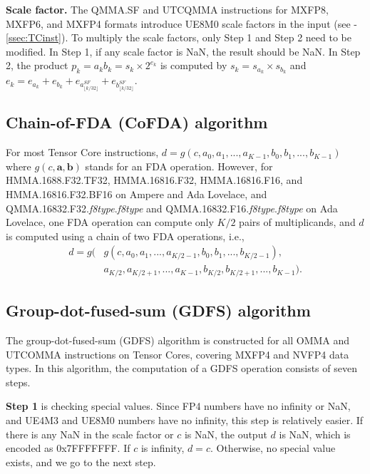 \textbf{Scale factor.} The QMMA.SF and UTCQMMA instructions for MXFP8, MXFP6, and MXFP4 formats introduce UE8M0 scale factors in the input (see -\ref{ssec:TCinst}). To multiply the scale factors, only Step 1 and Step 2 need to be modified. In Step 1, if any scale factor is NaN, the result should be NaN. In Step 2, the product $p_k=a_kb_k=s_k\times 2^{e_k}$ is computed by $s_k=s_{a_k}\times s_{b_k}$ and $e_k=e_{a_k}+e_{b_k}+e_{a^{SF}_{\lfloor k/32\rfloor}}+e_{b^{SF}_{\lfloor k/32\rfloor}}$.

\subsection{Chain-of-FDA (CoFDA) algorithm}

For most Tensor Core instructions, $d=g(c, a_0, a_1, ..., a_{K-1}, b_0, b_1, ..., b_{K-1})$ where $g(c, \mathbf{a}, \mathbf{b})$ stands for an FDA operation. However, for HMMA.1688.F32.TF32, HMMA.16816.F32, HMMA.16816.F16, and HMMA.16816.F32.BF16 on Ampere and Ada Lovelace, and QMMA.16832.F32.\textit{f8type}.\textit{f8type} and QMMA.16832.F16.\textit{f8type}.\textit{f8type} on Ada Lovelace, one FDA operation can compute only $K/2$ pairs of multiplicands, and $d$ is computed using a chain of two FDA operations, i.e.,
\begin{equation}
\label{eq:chain}
\begin{split}
    d=g( & g(c, a_0, a_1, ..., a_{K/2-1}, b_0, b_1, ..., b_{K/2-1}),\\
    &a_{K/2}, a_{K/2+1}, ..., a_{K-1}, b_{K/2}, b_{K/2+1}, ..., b_{K-1}).
\end{split}
\end{equation}


\subsection{Group-dot-fused-sum (GDFS) algorithm}

The group-dot-fused-sum (GDFS) algorithm is constructed for all OMMA and UTCOMMA instructions on Tensor Cores, covering MXFP4 and NVFP4 data types. In this algorithm, the computation of a GDFS operation consists of seven steps.

\textbf{Step 1} is checking special values. Since FP4 numbers have no infinity or NaN, and UE4M3 and UE8M0 numbers have no infinity, this step is relatively easier. If there is any NaN in the scale factor or $c$ is NaN, the output $d$ is NaN, which is encoded as 0x7FFFFFFF. If $c$ is infinity, $d=c$. Otherwise, no special value exists, and we go to the next step.

